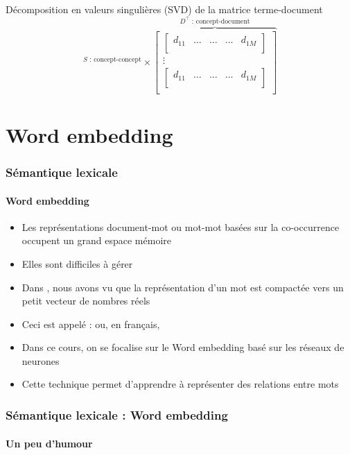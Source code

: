 \documentclass[xcolor=table]{beamer}
\begin{document}
\begin{frame}
\begin{block}{Décomposition en valeurs singulières (SVD) de la matrice terme-document}
\[{		}^{S \text{ : concept-concept}}
		\times 
		\overbrace{
			\begin{bmatrix}
			\begin{bmatrix}
			d_{11} & \ldots & \ldots & \ldots & d_{1M} \\
			\end{bmatrix}\\
			\vdots \\
			\begin{bmatrix}
			d_{11} & \ldots & \ldots & \ldots & d_{1M} \\
			\end{bmatrix}\\
			\end{bmatrix}
		}^{D^\top \text{ : concept-document}}
		\]
		
	\end{block}
	
\end{frame}


\section{Word embedding}

\begin{frame}
\frametitle{Sémantique lexicale}
\framesubtitle{Word embedding}

\begin{itemize}
	\item Les représentations document-mot ou mot-mot basées sur la co-occurrence occupent un grand espace mémoire 
	\item Elles sont difficiles à gérer 
	\item Dans , nous avons vu que la représentation d'un mot est compactée vers un petit vecteur de nombres réels
	\item Ceci est appelé :  ou, en français, 
	\item Dans ce cours, on se focalise sur le Word embedding basé sur les réseaux de neurones
	\item Cette technique permet d'apprendre à représenter des relations entre mots
\end{itemize}

\end{frame}


\begin{frame}
\frametitle{Sémantique lexicale : Word embedding}
\framesubtitle{Un peu d'humour}
\begin{center}
\end{center}
\end{frame}
\end{document}
